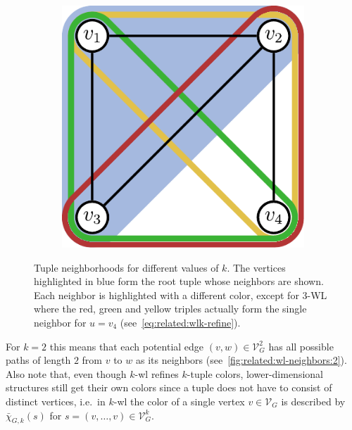 \begin{figure}[ht]
	\begin{subfigure}{0.33\textwidth}
		\centering
		\includegraphics[width=0.8\linewidth]{gfx/related-work/wl3-neighbors.pdf}
		\label{fig:related:wl-neighbors:3}
	\end{subfigure}
	\caption[\ac{wl} neighborhoods for different values of $k$.]{
		Tuple neighborhoods for different values of $k$.
		The vertices highlighted in \textcolor{t_blue}{blue} form the root tuple whose neighbors are shown.
		Each neighbor is highlighted with a different color, except for 3-WL where the \textcolor{t_red}{red}, \textcolor{t_green}{green} and \textcolor{t_darkyellow}{yellow} triples actually form the single neighbor for $u = v_4$ (see~\cref{eq:related:wlk-refine}).
	}\label{fig:related:wl-neighbors}
\end{figure}
For $k = 2$ this means that each potential edge $(v, w) \in \mathcal{V}_G^2$ has all possible paths of length $2$ from $v$ to $w$ as its neighbors (see~\cref{fig:related:wl-neighbors:2}).
Also note that, even though $k$-\acs{wl} refines $k$-tuple colors, lower-dimensional structures still get their own colors since a tuple does not have to consist of distinct vertices, i.e.\ in $k$-\acs{wl} the color of a single vertex $v \in \mathcal{V}_G$ is described by $\bar{\chi}_{G, k}(s)$ for $s = (v, \dots, v) \in \mathcal{V}_G^k$.


